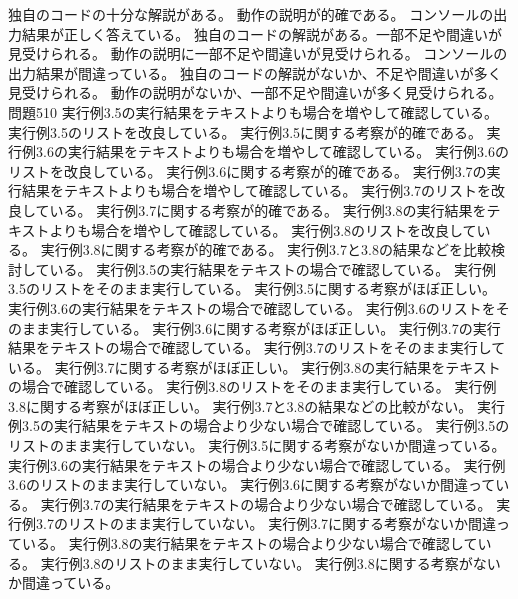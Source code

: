 {{	{独自のコードの十分な解説がある。}
	{動作の説明が的確である。}
	}
	{
  {コンソールの出力結果が正しく答えている。}
	{独自のコードの解説がある。一部不足や間違いが見受けられる。}
	{動作の説明に一部不足や間違いが見受けられる。}
	}
	{
  {コンソールの出力結果が間違っている。}
	{独自のコードの解説がないか、不足や間違いが多く見受けられる。}
	{動作の説明がないか、一部不足や間違いが多く見受けられる。}
	}
{問題5}{10}{
  {実行例3.5の実行結果をテキストよりも場合を増やして確認している。}
  {実行例3.5のリストを改良している。}
  {実行例3.5に関する考察が的確である。}
  {実行例3.6の実行結果をテキストよりも場合を増やして確認している。}
  {実行例3.6のリストを改良している。}
  {実行例3.6に関する考察が的確である。}
  {実行例3.7の実行結果をテキストよりも場合を増やして確認している。}
  {実行例3.7のリストを改良している。}
  {実行例3.7に関する考察が的確である。}
  {実行例3.8の実行結果をテキストよりも場合を増やして確認している。}
  {実行例3.8のリストを改良している。}
  {実行例3.8に関する考察が的確である。}
  {実行例3.7と3.8の結果などを比較検討している。}
	}
	{
  {実行例3.5の実行結果をテキストの場合で確認している。}
  {実行例3.5のリストをそのまま実行している。}
  {実行例3.5に関する考察がほぼ正しい。}
  {実行例3.6の実行結果をテキストの場合で確認している。}
  {実行例3.6のリストをそのまま実行している。}
  {実行例3.6に関する考察がほぼ正しい。}
  {実行例3.7の実行結果をテキストの場合で確認している。}
  {実行例3.7のリストをそのまま実行している。}
  {実行例3.7に関する考察がほぼ正しい。}
  {実行例3.8の実行結果をテキストの場合で確認している。}
  {実行例3.8のリストをそのまま実行している。}
  {実行例3.8に関する考察がほぼ正しい。}
  {実行例3.7と3.8の結果などの比較がない。}
	}
	{
  {実行例3.5の実行結果をテキストの場合より少ない場合で確認している。}
  {実行例3.5のリストのまま実行していない。}
  {実行例3.5に関する考察がないか間違っている。}
  {実行例3.6の実行結果をテキストの場合より少ない場合で確認している。}
  {実行例3.6のリストのまま実行していない。}
  {実行例3.6に関する考察がないか間違っている。}
  {実行例3.7の実行結果をテキストの場合より少ない場合で確認している。}
  {実行例3.7のリストのまま実行していない。}
  {実行例3.7に関する考察がないか間違っている。}
  {実行例3.8の実行結果をテキストの場合より少ない場合で確認している。}
  {実行例3.8のリストのまま実行していない。}
  {実行例3.8に関する考察がないか間違っている。}
	}
}